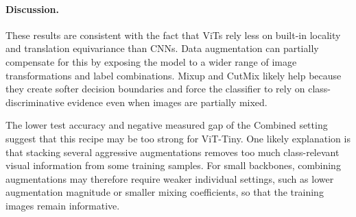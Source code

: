 \paragraph{Discussion.}
\label{sec:aug:discussion}

These results are consistent with the fact that ViTs rely less on built-in locality and translation equivariance than CNNs. Data augmentation can partially compensate for this by exposing the model to a wider range of image transformations and label combinations. Mixup and CutMix likely help because they create softer decision boundaries and force the classifier to rely on class-discriminative evidence even when images are partially mixed.

The lower test accuracy and negative measured gap of the Combined setting suggest that this recipe may be too strong for ViT-Tiny. One likely explanation is that stacking several aggressive augmentations removes too much class-relevant visual information from some training samples. For small backbones, combining augmentations may therefore require weaker individual settings, such as lower augmentation magnitude or smaller mixing coefficients, so that the training images remain informative.


